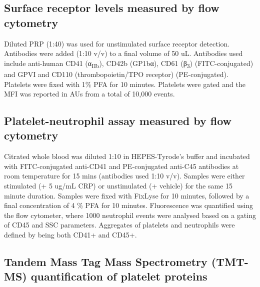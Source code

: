 \documentclass[11pt,twoside]{bristolthesis}
\begin{document}
\hypertarget{surface-receptor-levels-measured-by-flow-cytometry}{%
\subsection{Surface receptor levels measured by flow cytometry}\label{surface-receptor-levels-measured-by-flow-cytometry}}

Diluted PRP (1:40) was used for unstimulated surface receptor detection. Antibodies were added (1:10 v/v) to a final volume of 50 uL. Antibodies used include anti-human CD41 (α\textsubscript{IIb}), CD42b (GP1bα), CD61 (β\textsubscript{3}) (FITC-conjugated) and GPVI and CD110 (thrombopoietin/TPO receptor) (PE-conjugated). Platelets were fixed with 1\% PFA for 10 minutes. Platelets were gated and the MFI was reported in AUs from a total of 10,000 events.

\hypertarget{platelet-neutrophil-assay-measured-by-flow-cytometry}{%
\subsection{Platelet-neutrophil assay measured by flow cytometry}\label{platelet-neutrophil-assay-measured-by-flow-cytometry}}

Citrated whole blood was diluted 1:10 in HEPES-Tyrode's buffer and incubated with FITC-conjugated anti-CD41 and PE-conjugated anti-C45 antibodies at room temperature for 15 mins (antibodies used 1:10 v/v). Samples were either stimulated (+ 5 ug/mL CRP) or unstimulated (+ vehicle) for the same 15 minute duration. Samples were fixed with FixLyse for 10 minutes, followed by a final concentration of 4 \% PFA for 10 minutes. Fluorescence was quantified using the flow cytometer, where 1000 neutrophil events were analysed based on a gating of CD45 and SSC parameters. Aggregates of platelets and neutrophils were defined by being both CD41+ and CD45+.

\hypertarget{tandem-mass-tag-mass-spectrometry-tmt-ms-quantification-of-platelet-proteins}{%
\subsection{Tandem Mass Tag Mass Spectrometry (TMT-MS) quantification of platelet proteins}\label{tandem-mass-tag-mass-spectrometry-tmt-ms-quantification-of-platelet-proteins}}
\end{document}
